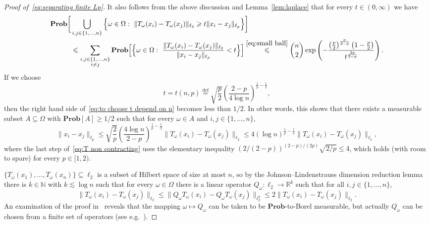 \documentclass[11pt,reqno]{amsart}
\renewcommand{\le}{\leqslant}
\renewcommand{\ge}{\geqslant}
\newcommand{\n}{\{1,\ldots,n\}}
\newcommand{\R}{\mathbb R}
\theoremstyle{remark}
\renewcommand{\subset}{\subseteq}
\newcommand{\N}{\mathbb N}
\newcommand{\eqdef}{\stackrel{\mathrm{def}}{=}}
\renewcommand{\Pr}{\mathbf{Prob}}
\renewcommand{\1}{\mathbf 1}
\begin{document}
\begin{proof}[Proof of~\eqref{eq:separating finite Lp}]
It also follows from the above discussion and Lemma~\ref{lem:laplace} that for every $t\in (0,\infty)$ we have
\begin{align}\label{eq:to choose t depend on n}
\begin{split}
\Pr\bigg[&\bigcup_{i,j\in \n}\Big\{\omega\in \Omega:\ \|T_\omega(x_i)-T_\omega(x_j)\|_{{\ell}_2}\ge t\|x_i-x_j\|_{{\ell}_p}\Big\}\bigg]\\&\le \sum_{\substack{i,j\in \n\\i\neq j}}\Pr\Big[\Big\{\omega\in \Omega:\ \frac{\|T_\omega(x_i)-T_\omega(x_j)\|_{{\ell}_2}}{\|x_i-x_j\|_{{\ell}_p}}<t\Big\}\Big]\stackrel{\eqref{eq:small ball}}{\le} \binom{n}{2}\exp\left(-\frac{\left(\frac{p}{2}\right)^{\frac{p}{2-p}}\left(1-\frac{p}{2}\right)}{t^{\frac{2p}{2-p}}}\right).
\end{split}
\end{align}
If we choose
$$
t=t(n,p)\eqdef  \sqrt{\frac{p}{2}}\left(\frac{2-p}{4\log n}\right)^{\frac{1}{p}-\frac12},
$$
then the right hand side of~\eqref{eq:to choose t depend on n} becomes less than $1/2$. In other words, this shows that there exists a measurable subset $A\subset \Omega$ with $\Pr[A]\ge 1/2$ such that for every $\omega\in A$ and $i,j\in \n$,
\begin{equation}\label{eq:T non contracting}
 \|x_i-x_j\|_{{\ell}_p}\le \sqrt{\frac{2}{p}}\left(\frac{4\log n}{2-p}\right)^{\frac{1}{p}-\frac12} \|T_\omega(x_i)-T_\omega(x_j)\|_{{\ell}_2}\le 4(\log n)^{\frac{1}{p}-\frac12}\|T_\omega(x_i)-T_\omega(x_j)\|_{{\ell}_2},
\end{equation}
where the last step of~\eqref{eq:T non contracting} uses the elementary inequality $(2/(2-p))^{(2-p)/(2p)}\sqrt{2/p}\le 4$, which holds (with room to spare) for every $p\in [1,2)$.

$\{T_\omega(x_1),\ldots,T_\omega(x_n)\}\subset {\ell}_2$ is a subset of Hilbert space of size  at most $n$, so by the Johnson--Lindenstrauss dimension reduction lemma~\cite{JL84} there is $k\in \N$ with $k\lesssim \log n$ such that for every $\omega\in \Omega$ there is a linear operator $Q_\omega:{\ell}_2\to \R^k$ such that for all $i,j\in \n$,
\begin{equation}\label{eq:use JL}
 \|T_\omega(x_i)-T_\omega(x_j)\|_{{\ell}_2}\le \|Q_\omega T_\omega(x_i)-Q_\omega T_\omega(x_j)\|_{\ell_2^k}\le 2\|T_\omega(x_i)-T_\omega(x_j)\|_{{\ell}_2}.
\end{equation}
An examination of the proof in~\cite{JL84} reveals that the mapping $\omega\mapsto Q_\omega$ can be taken to be $\Pr$-to-Borel  measurable, but actually $Q_\omega$ can be chosen from a finite set of operators (see e.g.~\cite{Ach03}).


\end{proof}
\end{document}
